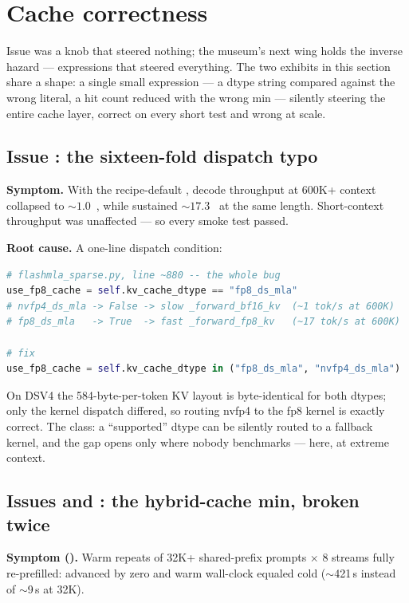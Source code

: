 \section{Cache correctness}
\label{sec:bugs-cache}

Issue  was a knob that steered nothing; the museum's next wing
holds the inverse hazard --- expressions that steered everything. The two
exhibits in this section share a shape: a single small expression
--- a dtype string compared against the wrong literal, a hit count reduced
with the wrong min --- silently steering the entire cache layer, correct on
every short test and wrong at scale.

\subsection{Issue : the sixteen-fold dispatch typo}

\textbf{Symptom.} With the recipe-default ,
decode throughput at 600K+ context collapsed to ${\sim}1.0$~\tokspersec{}, while
 sustained ${\sim}17.3$~\tokspersec{} at the same length.
Short-context throughput was unaffected --- so every smoke test passed.

\textbf{Root cause.} A one-line dispatch condition:

\begin{lstlisting}[language=Python]
# flashmla_sparse.py, line ~880 -- the whole bug
use_fp8_cache = self.kv_cache_dtype == "fp8_ds_mla"
# nvfp4_ds_mla -> False -> slow _forward_bf16_kv  (~1 tok/s at 600K)
# fp8_ds_mla   -> True  -> fast _forward_fp8_kv   (~17 tok/s at 600K)

# fix
use_fp8_cache = self.kv_cache_dtype in ("fp8_ds_mla", "nvfp4_ds_mla")
\end{lstlisting}

On DSV4 the 584-byte-per-token KV layout is byte-identical for both dtypes;
only the kernel dispatch differed, so routing nvfp4 to the fp8 kernel is
exactly correct. The class: a ``supported'' dtype can be silently routed to a
fallback kernel, and the gap opens only where nobody benchmarks --- here, at
extreme context.

\subsection{Issues  and : the hybrid-cache min, broken twice}

\textbf{Symptom ().} Warm repeats of 32K+ shared-prefix prompts
$\times$ 8 streams fully re-prefilled:  advanced
by zero and warm wall-clock equaled cold ($\sim$421\,s instead of $\sim$9\,s
at 32K).

